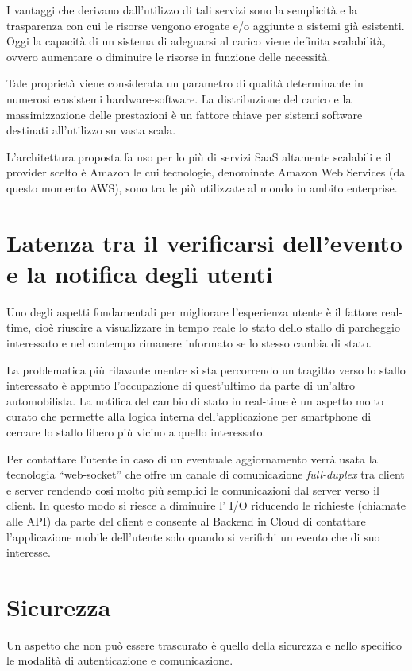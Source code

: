 I vantaggi che derivano dall'utilizzo di tali servizi sono la semplicità e la trasparenza con cui le risorse vengono erogate e/o aggiunte a sistemi già esistenti. Oggi la capacità di un sistema di adeguarsi al carico viene definita scalabilità, ovvero aumentare o diminuire le risorse in funzione delle necessità.

Tale proprietà viene considerata un parametro di qualità determinante in numerosi ecosistemi hardware-software. La distribuzione del carico e la massimizzazione delle prestazioni è un fattore chiave per sistemi software destinati all'utilizzo su vasta scala.

L'architettura proposta fa uso per lo più di servizi SaaS altamente scalabili e il provider scelto è Amazon le cui tecnologie, denominate Amazon Web Services (da questo momento AWS), sono tra le più utilizzate al mondo in ambito enterprise.


\section*{Latenza tra il verificarsi dell'evento e la notifica degli utenti}
Uno degli aspetti fondamentali per migliorare l'esperienza utente è il fattore real-time, cioè riuscire a visualizzare in tempo reale lo stato dello stallo di parcheggio interessato e nel contempo rimanere informato se lo stesso cambia di stato. 

La problematica più rilavante mentre si sta percorrendo un tragitto verso lo stallo interessato è appunto l'occupazione di quest'ultimo da parte di un'altro automobilista. 
La notifica del cambio di stato in real-time è un aspetto molto curato che permette alla logica interna dell'applicazione per smartphone di cercare lo stallo libero più vicino a quello interessato. 

Per contattare l'utente  in caso di un eventuale aggiornamento verrà usata la tecnologia ``web-socket'' che offre un canale di comunicazione {\itshape full-duplex} tra client e server rendendo cosi molto più semplici le comunicazioni dal server verso il client. 
In questo modo si riesce a diminuire l' I/O riducendo le richieste (chiamate alle API) da parte del client e consente al Backend in Cloud di contattare l'applicazione mobile dell'utente solo quando si verifichi un evento che di suo interesse.

\section*{Sicurezza}
Un aspetto che non può essere trascurato è quello della sicurezza e nello specifico le modalità di autenticazione e comunicazione.


